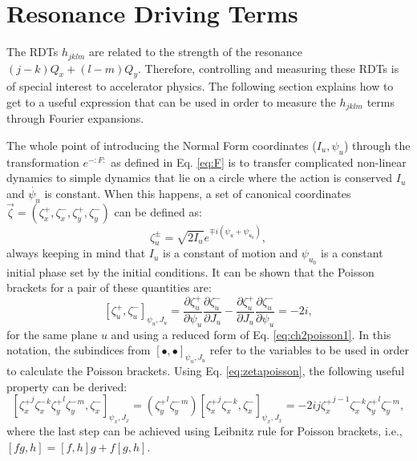 \section{\label{sec:rdts}Resonance Driving Terms} 

The RDTs $h_{jklm}$ are related to the strength of the resonance $\left( j-k \right) Q_x + \left( l-m\right) Q_y$. Therefore, controlling and measuring these RDTs is of special interest to accelerator physics. The following section explains how to get to a useful expression that can be used in order to measure the $h_{jklm}$ terms through Fourier expansions.

The whole point of introducing the Normal Form coordinates ($I_u,\psi_u$) through the transformation $e^{-:F:}$ as defined in Eq. \ref{eq:F} is to transfer complicated non-linear dynamics to simple dynamics that lie on a circle where the action is conserved $I_u$ and $\dot{\psi_u}$ is constant. When this happens, a set of canonical coordinates $\vec{\zeta} = \left( \zeta_x^+ , \zeta_x^-, \zeta_y^+, \zeta_y^-\right)$ can be defined as:
\begin{equation}
    \label{eq:zeta}
    \zeta_u^{\pm}=\sqrt{2I_u}e^{\mp i\left( \psi_u + \psi_{u_0}\right)},
\end{equation}
always keeping in mind that $I_u$ is a constant of motion and $\psi_{u_0}$ is a constant initial phase set by the initial conditions. It can be shown that the Poisson brackets for a pair of these quantities are:
\begin{equation}
    \label{eq:zetapoisson}
    \left[ \zeta_u^{+}, \zeta_u^{-} \right]_{\psi_u,J_u} = \frac{\partial \zeta_u^{+}}{\partial \psi_u}\frac{\partial \zeta_u^{-}}{\partial J_u} - \frac{\partial \zeta_u^{+}}{\partial J_u}\frac{\partial \zeta_u^{-}}{\partial \psi_u}=-2i,
\end{equation}
for the same plane $u$ and using a reduced form of Eq. \ref{eq:ch2poisson1}. In this notation, the subindices from $[\bullet,\bullet]_{\psi_u,J_u}$ refer to the variables to be used in order to calculate the Poisson brackets. Using Eq. \ref{eq:zetapoisson}, the following useful property can be derived:
\begin{equation}
    \label{eq:zetapoisson2}
    \left[ {\zeta_x^{+}}^j {\zeta_x^{-}}^k {\zeta_y^{+}}^l {\zeta_y^{-}}^m, \zeta_x^{-} \right]_{\psi_x,J_x} = \left( {\zeta_y^{+}}^l {\zeta_y^{-}}^m \right)\left[ {\zeta_x^{+}}^j {\zeta_x^{-}}^k, \zeta_x^{-} \right]_{\psi_x,J_x} =-2ij {\zeta_x^{+}}^{j-1} {\zeta_x^{-}}^k {\zeta_y^{+}}^l {\zeta_y^{-}}^m ,
\end{equation}   
where the last step can be achieved using Leibnitz rule for Poisson brackets, i.e., $[fg,h]=[f,h]g+f[g,h]$.

